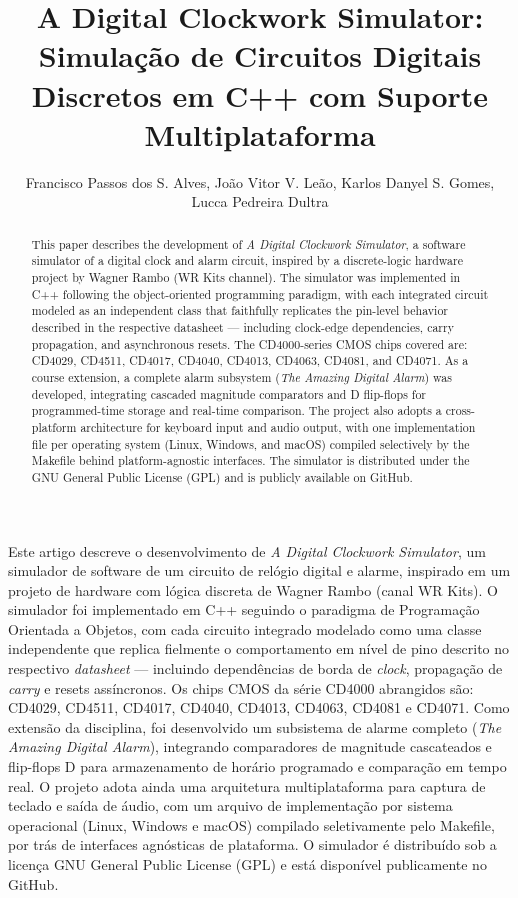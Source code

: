 \documentclass[12pt]{article}
\title{A Digital Clockwork Simulator: Simulação de Circuitos Digitais Discretos em C++ com Suporte Multiplataforma}
\author{
  Francisco Passos dos S. Alves\inst{1},
  João Vitor V. Leão\inst{1},
  Karlos Danyel S. Gomes\inst{1}, \\
  Lucca Pedreira Dultra\inst{1}
}
\begin{document}
\maketitle

\begin{abstract}
This paper describes the development of \textit{A Digital Clockwork Simulator}, a software simulator of a digital clock and alarm circuit, inspired by a discrete-logic hardware project by Wagner Rambo (WR Kits channel). The simulator was implemented in C++ following the object-oriented programming paradigm, with each integrated circuit modeled as an independent class that faithfully replicates the pin-level behavior described in the respective datasheet — including clock-edge dependencies, carry propagation, and asynchronous resets. The CD4000-series CMOS chips covered are: CD4029, CD4511, CD4017, CD4040, CD4013, CD4063, CD4081, and CD4071. As a course extension, a complete alarm subsystem (\textit{The Amazing Digital Alarm}) was developed, integrating cascaded magnitude comparators and D flip-flops for programmed-time storage and real-time comparison. The project also adopts a cross-platform architecture for keyboard input and audio output, with one implementation file per operating system (Linux, Windows, and macOS) compiled selectively by the Makefile behind platform-agnostic interfaces. The simulator is distributed under the GNU General Public License (GPL) and is publicly available on GitHub.
\end{abstract}

\begin{resumo}
Este artigo descreve o desenvolvimento de \textit{A Digital Clockwork Simulator}, um simulador de software de um circuito de relógio digital e alarme, inspirado em um projeto de hardware com lógica discreta de Wagner Rambo (canal WR Kits). O simulador foi implementado em C++ seguindo o paradigma de Programação Orientada a Objetos, com cada circuito integrado modelado como uma classe independente que replica fielmente o comportamento em nível de pino descrito no respectivo \textit{datasheet} — incluindo dependências de borda de \textit{clock}, propagação de \textit{carry} e resets assíncronos. Os chips CMOS da série CD4000 abrangidos são: CD4029, CD4511, CD4017, CD4040, CD4013, CD4063, CD4081 e CD4071. Como extensão da disciplina, foi desenvolvido um subsistema de alarme completo (\textit{The Amazing Digital Alarm}), integrando comparadores de magnitude cascateados e flip-flops D para armazenamento de horário programado e comparação em tempo real. O projeto adota ainda uma arquitetura multiplataforma para captura de teclado e saída de áudio, com um arquivo de implementação por sistema operacional (Linux, Windows e macOS) compilado seletivamente pelo Makefile, por trás de interfaces agnósticas de plataforma. O simulador é distribuído sob a licença GNU General Public License (GPL) e está disponível publicamente no GitHub.
\end{resumo}
\end{document}
